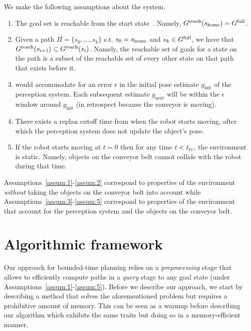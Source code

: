 \documentclass[conference]{IEEEtran}
\begin{document}
We make the following assumptions about the system.
\begin{enumerate}[label={\textbf{A\arabic*}},leftmargin=0.75cm]
    \item \label{assum:1} The goal set \Gfull is reachable from the start state~\Shome. Namely,  $G^{\rm reach}(s_{\textrm{home}}) = G^{\textrm{full}}$.
    
    \item \label{assum:2} Given a path 
    $\Pi = \{s_0, \ldots, s_k \}$ 
    s.t. $s_0 = s_{\textrm{home}}$ and $s_k \in G^{\textrm{full}}$, 
    we have that $G^{\rm reach}(s_{i+1}) \subset G^{\rm reach}(s_{i})$.
    Namely, the reachable set of goals for a state on the path is a subset of the reachable set of every other state on that path that exists before it.
    
    \item \label{assum:3} \Gfull would accommodate for an error $\epsilon$ in the initial pose estimate $g_{\textrm{init}}$ of the perception system. Each subsequent estimate $g_{\textrm{next}}$ will be within the $\epsilon$ window around $g_{\textrm{init}}$ (in retrospect because the conveyor is moving).
    
    \item \label{assum:4} There exists a replan cutoff time \Trc from when the robot starts moving, after which the perception system does not update the object's pose.
    
    \item \label{assum:5} If the robot starts moving at $t = 0$ then for any time $t < t_{\textrm{rc}}$, the environment is static. Namely, objects on the conveyor belt cannot collide with the robot during that time.
\end{enumerate}

Assumptions~\ref{assum:1}-\ref{assum:2} correspond to properties of the environment \emph{without} taking the objects on the conveyor belt into account 
while
Assumptions~\ref{assum:3}-\ref{assum:5} correspond to properties of the environment that account for the perception system and the objects on the conveyor belt.


\section{Algorithmic framework}
\label{subsec:strawman}
Our approach for bounded-time planning relies on a \emph{preprocessing} stage that allows to efficiently compute paths in a \emph{query} stage to any goal state (under Assumptions~\ref{assum:1}-\ref{assum:5}). 
%
Before we describe our approach, we start by describing a \naive method that solves the aforementioned problem but requires a prohibitive amount of memory.
%
This can be seen as a warmup before describing our algorithm which exhibits the same traits but doing so in a memory-efficient manner.
\end{document}
